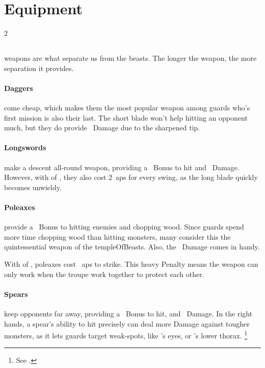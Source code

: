 \section{Equipment}

\begin{multicols}{2}

\subsection{}

\Glspl{weapon} are what separate us from the beasts.
The longer the \gls{weapon}, the more separation it provides.

\Dagger
\paragraph{Daggers}
come cheap, which makes them the most popular weapon among \glspl{guard} who's first mission is also their last.
The short blade won't help hitting an opponent much, but they do provide ~Damage due to the sharpened tip.

\longsword
\paragraph{Longswords}
make a descent all-round \gls{weapon}, providing a ~Bonus to hit and ~Damage.
However, with  of , they also cost 2~\glspl{ap} for every swing, as the long blade quickly becomes unwieldy.

\poleaxe
\paragraph{Poleaxes}
provide a ~Bonus to hitting enemies and chopping wood.
Since \glspl{guard} spend more time chopping wood than hitting \glspl{monster}, many consider this the quintessential \gls{weapon} of the \gls{templeOfBeasts}.
Also, the ~Damage comes in handy.

With  of , poleaxes cost ~\glspl{ap} to strike.
This heavy Penalty means the weapon can only work when the troupe work together to protect each other.

\spear
\paragraph{Spears}
keep opponents far away, providing a ~Bonus to hit, and ~Damage.
In the right hands, a spear's ability to hit precisely can deal more Damage against tougher \glspl{monster}, as it lets \glspl{guard} target weak-spots, like 's eyes, or 's lower thorax.%
\footnote{See  .}


\end{multicols}
